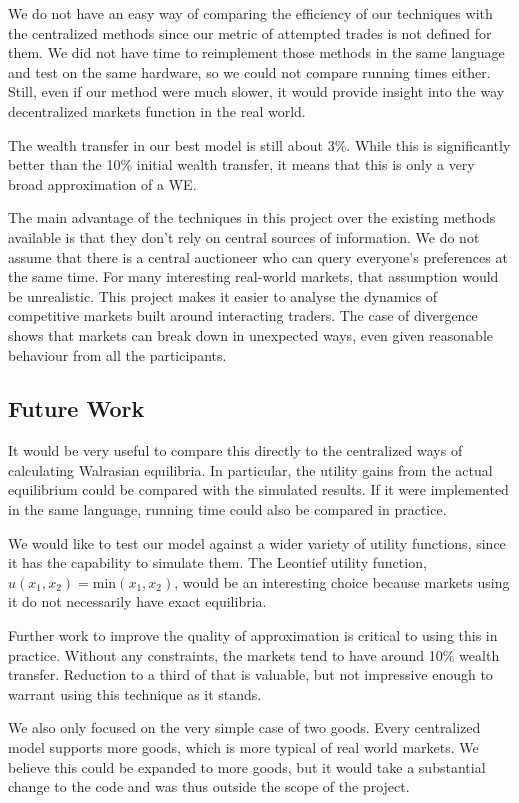 \documentclass[12pt,a4paper,titlepage]{article}
\begin{document}
We do not have an easy way of comparing the efficiency of our techniques with the centralized methods since our metric of attempted trades is not defined for them.
We did not have time to reimplement those methods in the same language and test on the same hardware, so we could not compare running times either.
Still, even if our method were much slower, it would provide insight into the way decentralized markets function in the real world.

The wealth transfer in our best model is still about 3\%.
While this is significantly better than the 10\% initial wealth transfer, it means that this is only a very broad approximation of a WE.

The main advantage of the techniques in this project over the existing methods available is that they don't rely on central sources of information.
We do not assume that there is a central auctioneer who can query everyone's preferences at the same time.
For many interesting real-world markets, that assumption would be unrealistic.
This project makes it easier to analyse the dynamics of competitive markets built around interacting traders.
The case of divergence shows that markets can break down in unexpected ways, even given reasonable behaviour from all the participants.

\subsection{Future Work}
It would be very useful to compare this directly to the centralized ways of calculating Walrasian equilibria.
In particular, the utility gains from the actual equilibrium could be compared with the simulated results.
If it were implemented in the same language, running time could also be compared in practice.

We would like to test our model against a wider variety of utility functions, since it has the capability to simulate them.
The Leontief utility function, $u(x_1,x_2) = \mathrm{min}(x_1, x_2)$, would be an interesting choice because markets using it do not necessarily have exact equilibria.

Further work to improve the quality of approximation is critical to using this in practice.
Without any constraints, the markets tend to have around 10\% wealth transfer. 
Reduction to a third of that is valuable, but not impressive enough to warrant using this technique as it stands.

We also only focused on the very simple case of two goods.
Every centralized model supports more goods, which is more typical of real world markets.
We believe this could be expanded to more goods, but it would take a substantial change to the code and was thus outside the scope of the project.
\end{document}
